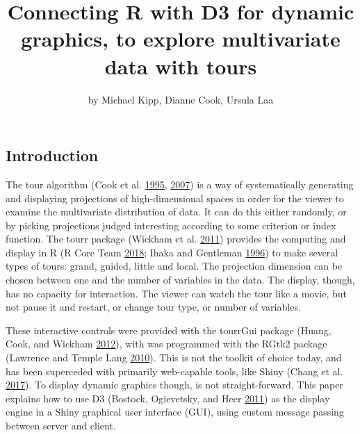 \title{Connecting R with D3 for dynamic graphics, to explore multivariate data
with tours}
\author{by Michael Kipp, Dianne Cook, Ursula Laa}

\maketitle



\hypertarget{introduction}{%
\subsection{Introduction}\label{introduction}}

The tour algorithm (Cook et al. \protect\hyperlink{ref-gt_pp}{1995},
\protect\hyperlink{ref-gt_pp_mc}{2007}) is a way of systematically
generating and displaying projections of high-dimensional spaces in
order for the viewer to examine the multivariate distribution of data.
It can do this either randomly, or by picking projections judged
interesting according to some criterion or index function. The tourr
package (Wickham et al. \protect\hyperlink{ref-tourr}{2011}) provides
the computing and display in R (R Core Team
\protect\hyperlink{ref-R}{2018}; Ihaka and Gentleman
\protect\hyperlink{ref-ihaka:1996}{1996}) to make several types of
tours: grand, guided, little and local. The projection dimension can be
chosen between one and the number of variables in the data. The display,
though, has no capacity for interaction. The viewer can watch the tour
like a movie, but not pause it and restart, or change tour type, or
number of variables.

These interactive controls were provided with the tourrGui package
(Huang, Cook, and Wickham \protect\hyperlink{ref-tourrGui}{2012}), with
was programmed with the RGtk2 package (Lawrence and Temple Lang
\protect\hyperlink{ref-RGtk2}{2010}). This is not the toolkit of choice
today, and has been superceded with primarily web-capable tools, like
Shiny (Chang et al. \protect\hyperlink{ref-shiny}{2017}). To display
dynamic graphics though, is not straight-forward. This paper explains
how to use D3 (Bostock, Ogievetsky, and Heer
\protect\hyperlink{ref-D3}{2011}) as the display engine in a Shiny
graphical user interface (GUI), using custom message passing between
server and client.

